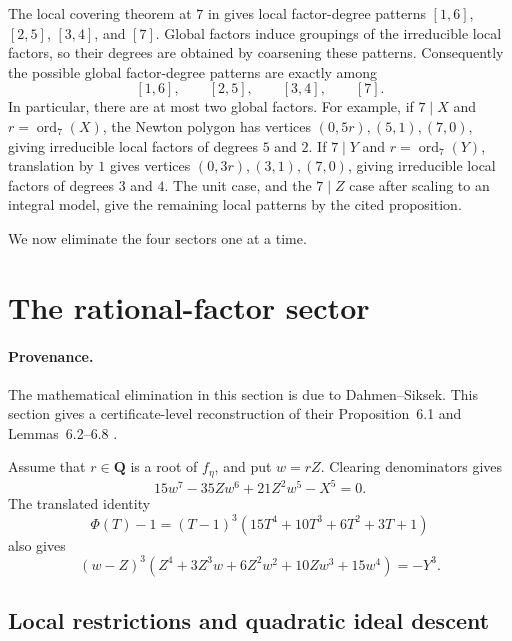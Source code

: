 \documentclass[11pt]{article}
\newcommand{\Q}{\mathbf Q}
\newcommand{\ord}{\operatorname{ord}}
\theoremstyle{definition}
\theoremstyle{remark}
\begin{document}
The local covering theorem at $7$ in \cite[Proposition~3.5]{DahmenSiksek}
gives local factor-degree patterns $[1,6]$, $[2,5]$, $[3,4]$, and $[7]$.
Global factors induce groupings of the irreducible local factors, so their
degrees are obtained by coarsening these patterns.  Consequently the
possible global factor-degree patterns are exactly among
\begin{equation}\label{eq:four-sectors}
                  [1,6],\qquad [2,5],\qquad [3,4],\qquad [7].
\end{equation}
In particular, there are at most two global factors.  For example, if
$7\mid X$ and $r=\ord_7(X)$, the Newton polygon has vertices
$(0,5r),(5,1),(7,0)$, giving irreducible local factors of degrees $5$ and $2$.
If $7\mid Y$ and $r=\ord_7(Y)$, translation by $1$ gives vertices
$(0,3r),(3,1),(7,0)$, giving irreducible local factors of degrees $3$ and $4$.
The unit case, and the $7\mid Z$ case after scaling to an integral model,
give the remaining local patterns by the cited proposition.

We now eliminate the four sectors one at a time.

\section{The rational-factor sector}

\paragraph{Provenance.}
The mathematical elimination in this section is due to Dahmen--Siksek.  This
section gives a certificate-level reconstruction of their
Proposition~6.1 and Lemmas~6.2--6.8 \cite[Section~6]{DahmenSiksek}.

Assume that $r\in\Q$ is a root of $f_\eta$, and put $w=rZ$.
Clearing denominators gives
\begin{equation}\label{eq:rational-root-cleared}
       15w^7-35Zw^6+21Z^2w^5-X^5=0.
\end{equation}
The translated identity
\[
 \Phi(T)-1=(T-1)^3(15T^4+10T^3+6T^2+3T+1)
\]
also gives
\begin{equation}\label{eq:quartic-cube}
 (w-Z)^3
 (Z^4+3Z^3w+6Z^2w^2+10Zw^3+15w^4)=-Y^3.
\end{equation}

\subsection{Local restrictions and quadratic ideal descent}
\end{document}
